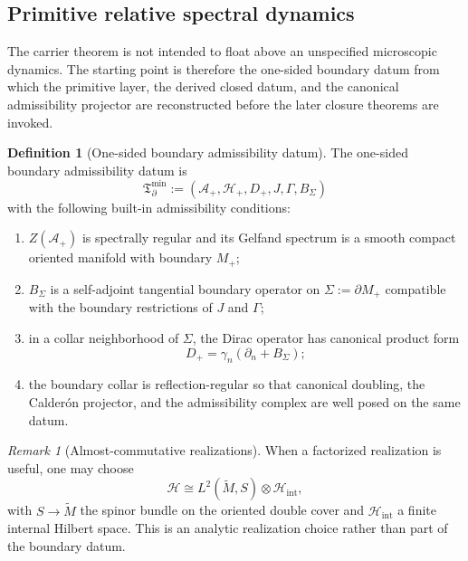 \documentclass[11pt,a4paper]{article}
\theoremstyle{definition}
\newtheorem{definition}[theorem]{Definition}
\theoremstyle{remark}
\newtheorem*{remark}{Remark}
\newcommand{\Hint}{\mathcal H_{\mathrm{int}}}
\newcommand{\Tbound}{\mathfrak T_{\partial}^{\min}}
\begin{document}
\subsection{Primitive relative spectral dynamics}

The carrier theorem is not intended to float above an unspecified microscopic dynamics. The
starting point is therefore the one-sided boundary datum from which the primitive layer, the
derived closed datum, and the canonical admissibility projector are reconstructed before the later
closure theorems are invoked.

\begin{definition}[One-sided boundary admissibility datum]
\label{def:reduced-theorem-datum}
The one-sided boundary admissibility datum is
\[
\Tbound:=(\mathcal A_+,\mathcal H_+,D_+,J,\Gamma,B_\Sigma)
\]
with the following built-in admissibility conditions:
\begin{enumerate}[label=(\roman*), leftmargin=1.5em, topsep=3pt, itemsep=2pt]
    \item $Z(\mathcal A_+)$ is spectrally regular and its Gelfand spectrum is a smooth compact oriented manifold with boundary $M_+$;
    \item $B_\Sigma$ is a self-adjoint tangential boundary operator on $\Sigma:=\partial M_+$ compatible with the boundary restrictions of $J$ and $\Gamma$;
    \item in a collar neighborhood of $\Sigma$, the Dirac operator has canonical product form
    \[
    D_+=\gamma_n(\partial_n+B_\Sigma);
    \]
    \item the boundary collar is reflection-regular so that canonical doubling, the Calder\'on projector, and the admissibility complex are well posed on the same datum.
\end{enumerate}
\end{definition}

\begin{remark}[Almost-commutative realizations]
\label{ass:almost-commutative-factorization}
When a factorized realization is useful, one may choose
\[
\mathcal H\cong L^2(\widetilde M,S)\otimes \Hint,
\]
with $S\to\widetilde M$ the spinor bundle on the oriented double cover and $\Hint$ a finite
internal Hilbert space. This is an analytic realization choice rather than part of the boundary
datum.
\end{remark}
\end{document}
